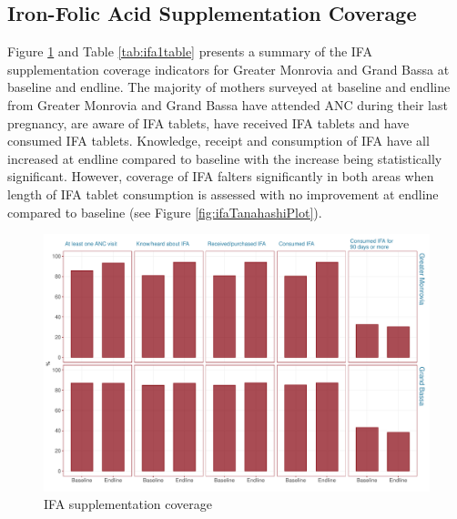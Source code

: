 \documentclass[12pt,a4paper]{article}
\begin{document}
\hypertarget{iron-folic-acid-supplementation-coverage}{%
\subsection{Iron-Folic Acid Supplementation Coverage}\label{iron-folic-acid-supplementation-coverage}}

Figure \ref{fig:ifa1plot} and Table \ref{tab:ifa1table} presents a summary of the IFA supplementation coverage indicators for Greater Monrovia and Grand Bassa at baseline and endline. The majority of mothers surveyed at baseline and endline from Greater Monrovia and Grand Bassa have attended ANC during their last pregnancy, are aware of IFA tablets, have received IFA tablets and have consumed IFA tablets. Knowledge, receipt and consumption of IFA have all increased at endline compared to baseline with the increase being statistically significant. However, coverage of IFA falters significantly in both areas when length of IFA tablet consumption is assessed with no improvement at endline compared to baseline (see Figure \ref{fig:ifaTanahashiPlot}).

\begin{figure}[H]

{\centering \includegraphics{liberiaCoverageFinalReport_files/figure-latex/ifa1plot-1} 

}

\caption{IFA supplementation coverage}\label{fig:ifa1plot}
\end{figure}
\end{document}
